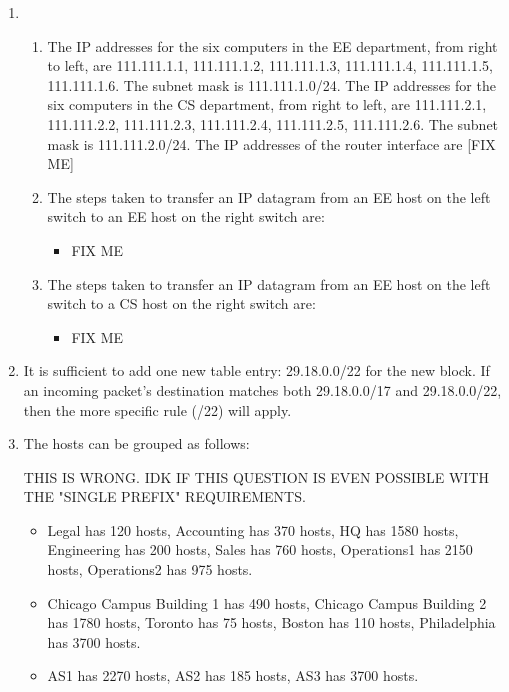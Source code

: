 \documentclass{article}
\begin{document}
\begin{enumerate}
\item
\begin{enumerate}
\item The IP addresses for the six computers in the EE department, from right to left, are 111.111.1.1, 111.111.1.2, 111.111.1.3, 111.111.1.4, 111.111.1.5, 111.111.1.6. The subnet mask is 111.111.1.0/24.
The IP addresses for the six computers in the CS department, from right to left, are 111.111.2.1, 111.111.2.2, 111.111.2.3, 111.111.2.4, 111.111.2.5, 111.111.2.6. The subnet mask is 111.111.2.0/24.
The IP addresses of the router interface are [FIX ME]
\item The steps taken to transfer an IP datagram from an EE host on the left switch to an EE host on the right switch are:
\begin{itemize}
\item FIX ME
\end{itemize}
\item The steps taken to transfer an IP datagram from an EE host on the left switch to a CS host on the right switch are:
\begin{itemize}
\item FIX ME
\end{itemize}
\end{enumerate}

\item It is sufficient to add one new table entry: 29.18.0.0/22 for the new block. If an incoming packet's destination matches both 29.18.0.0/17 and 29.18.0.0/22, then the more specific rule (/22) will apply.

\item The hosts can be grouped as follows:

THIS IS WRONG. IDK IF THIS QUESTION IS EVEN POSSIBLE WITH THE "SINGLE PREFIX" REQUIREMENTS.
\begin{itemize}
\item Legal has 120 hosts, Accounting has 370 hosts, HQ has 1580 hosts, Engineering has 200 hosts, Sales has 760 hosts, Operations1 has 2150 hosts, Operations2 has 975 hosts.
\item Chicago Campus Building 1 has 490 hosts, Chicago Campus Building 2 has 1780 hosts, Toronto has 75 hosts, Boston has 110 hosts, Philadelphia has 3700 hosts.
\item AS1 has 2270 hosts, AS2 has 185 hosts, AS3 has 3700 hosts.
\end{itemize}


\end{enumerate}
\end{document}
